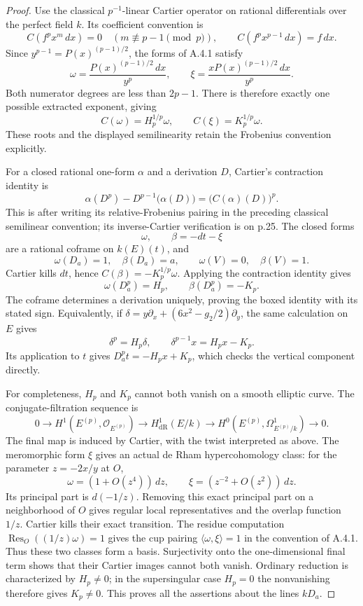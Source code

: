 \begin{proof}
Use the classical $p^{-1}$-linear Cartier operator on rational
differentials over the perfect field $k$. Its coefficient convention is
\[
 C(f^px^m\,dx)=0\quad(m\not\equiv p-1\pmod p),\qquad
 C(f^px^{p-1}\,dx)=f\,dx.
\]
Since $y^{p-1}=P(x)^{(p-1)/2}$, the forms of A.4.1 satisfy
\[
 \omega=\frac{P(x)^{(p-1)/2}\,dx}{y^p},\qquad
 \xi=\frac{xP(x)^{(p-1)/2}\,dx}{y^p}.
\]
Both numerator degrees are less than $2p-1$. There is therefore
exactly one possible extracted exponent, giving
\[
 C(\omega)=H_p^{1/p}\omega,\qquad
 C(\xi)=K_p^{1/p}\omega.
\]
These roots and the displayed semilinearity retain the Frobenius
convention explicitly.

For a closed rational one-form $\alpha$ and a derivation $D$,
Cartier's contraction identity is
\[
 \alpha(D^p)-D^{p-1}\bigl(\alpha(D)\bigr)
       =\bigl(C(\alpha)(D)\bigr)^p.
\]
This is \cite[Proposition 1.2.4, equation (1.2.4.5), p.24]{EllOgus1994}
after writing its relative-Frobenius pairing in the preceding
classical semilinear convention; its inverse-Cartier verification
is on p.25.
The closed forms
\[
 \omega,\qquad \beta=-dt-\xi
\]
are a rational coframe on $k(E)(t)$, and
\[
 \omega(D_a)=1,\quad \beta(D_a)=a,\qquad
 \omega(V)=0,\quad \beta(V)=1.
\]
Cartier kills $dt$, hence $C(\beta)=-K_p^{1/p}\omega$.
Applying the contraction identity gives
\[
 \omega(D_a^p)=H_p,\qquad \beta(D_a^p)=-K_p.
\]
The coframe determines a derivation uniquely, proving the boxed
identity with its stated sign. Equivalently, if
$\delta=y\partial_x+(6x^2-g_2/2)\partial_y$, the same calculation
on $E$ gives
\[
 \delta^p=H_p\delta,\qquad
 \delta^{p-1}x=H_px-K_p.
\]
Its application to $t$ gives
$D_a^pt=-H_px+K_p$, which checks the vertical component directly.

For completeness, $H_p$ and $K_p$ cannot both vanish on a smooth
elliptic curve. The conjugate-filtration sequence is
\[
 0\longrightarrow H^1(E^{(p)},\mathcal O_{E^{(p)}})
 \longrightarrow H^1_{\mathrm{dR}}(E/k)
 \longrightarrow H^0(E^{(p)},\Omega^1_{E^{(p)}/k})
 \longrightarrow0.
\]
The final map is induced by Cartier, with the twist interpreted
as above. The meromorphic form $\xi$ gives an actual de Rham
hypercohomology class: for the parameter $z=-2x/y$ at $O$,
\[
 \omega=(1+O(z^4))\,dz,\qquad
 \xi=(z^{-2}+O(z^2))\,dz.
\]
Its principal part is $d(-1/z)$. Removing this exact principal
part on a neighborhood of $O$ gives regular local representatives
and the overlap function $1/z$. Cartier kills their exact
transition. The residue computation
$\operatorname{Res}_O((1/z)\omega)=1$ gives the cup pairing
$\langle\omega,\xi\rangle=1$ in the convention of A.4.1.
Thus these two classes form a basis. Surjectivity onto the
one-dimensional final term shows that their Cartier images
cannot both vanish. Ordinary reduction is characterized by
$H_p\ne0$; in the supersingular case $H_p=0$ the nonvanishing
therefore gives $K_p\ne0$. This proves all the assertions about
the lines $kD_a$.
\end{proof}

